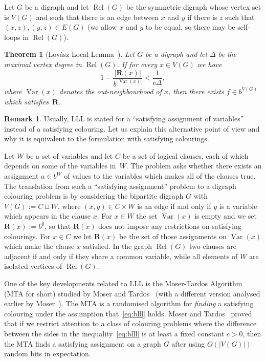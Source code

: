 \documentclass[12pt,a4paper]{article}
\numberwithin{equation}{section}
\newtheorem{theorem}[equation]{Theorem} %
\theoremstyle{definition}
\newtheorem{remark}[equation]{Remark}
\newenvironment{myrem}{%
        \begin{mdframed}[%
            linewidth=4pt, 
            topline=false, 
            bottomline=false, 
            rightline=false,%
            leftmargin=0pt, 
            innerleftmargin=0.4em, 
            rightmargin=0pt, 
            innerrightmargin=0pt, 
            innertopmargin=0pt ,%
            innerbottommargin=0pt, 
            splittopskip=\topskip, 
            splitbottomskip=0.3\topskip, %
            ]%
        \begin{remark}
    }{%
        \end{remark}
        \end{mdframed}
    }
\newcommand{\De}{{\Delta}}
\newcommand\Rel{\operatorname{Rel}}
\newcommand\Var{\operatorname{Var}}
\newcommand{\me}{\mathrm{e}}
\begin{document}
    Let $G$ be a digraph and let $\Rel(G)$ be the symmetric digraph whose vertex set is $V(G)$ and such that there is an edge between $x$ and $y$ if there is $z$ such that $(x,z),(y,z)\in E(G)$ (we allow $x$ and $y$ to be equal, so there may be self-loops in $\Rel(G)$).
    
    \begin{theorem}[Lov{\'a}sz Local Lemma~\cite{MR0491337}]\label{blll} 
    Let $G$ be a digraph and let $\De$ be the maximal vertex degree in $\Rel(G)$. If for every $x\in V(G)$ we have 
     \begin{equation}\label{eq:blll}
     1 - \frac{|\mathbf R(x)|}{b^{|\Var(x)|}} < \frac{1}{\me\De},
     \end{equation} where $\Var(x)$ denotes the out-neighbourhood of $x$,  then there exists $f\in b^{ V(G)}$ which satisfies~$\mathbf R$.
    \end{theorem}
    
    \begin{myrem}
    Usually, LLL is stated for a ``satisfying assignment of variables'' instead of a satisfying colouring. Let us explain this alternative point of view and why it is equivalent to the formulation with satisfying colourings. 
    
    Let $W$ be a set of variables and let $C$ be a set of logical clauses, each of which depends on some of the variables in~$W$. The problem asks whether there exists an assignment $a\in b^W$ of values to the variables which makes all of the clauses true. The translation from such a ``satisfying assignment'' problem to a digraph colouring problem is by considering the bipartite digraph $G$ with $V(G):= C \sqcup W$, where $(x,y)\in C\times W$ is an edge if and only if  $y$ is a variable which appears in the clause $x$. For $x\in W$ the set $\Var(x)$ is empty and we set $\mathbf R(x):=b^\emptyset$, so that $\mathbf R(x)$ does not impose any restrictions on satisfying colourings. For $x\in C$ we let $\mathbf R(x)$ be the set of those assignments on $\Var(x)$ which make the clause $x$ satisfied. In the graph $\Rel(G)$ two clauses are adjacent if and only if they share a common variable, while all elements of $W$ are isolated vertices of $\Rel(G)$.
    \end{myrem}
    
    
    One of the key developments related to LLL is the Moser-Tardos Algorithm (MTA for short) studied by Moser and Tardos~\cite{MR2606086} (with a different version analysed earlier by  Moser~\cite{MR2780080}). The MTA is a randomised algorithm for \textit{finding} a satisfying colouring under the assumption that~\eqref{eq:blll} holds. Moser and Tardos~\cite{MR2606086} proved that if we restrict attention to a class of colouring problems where the difference between the sides in the inequality~\eqref{eq:blll} is at least a fixed constant $c>0$, then the MTA finds a satisfying assignment on a graph $G$ after using $O(|V(G)|)$ random bits in expectation. 
    
\end{document}
